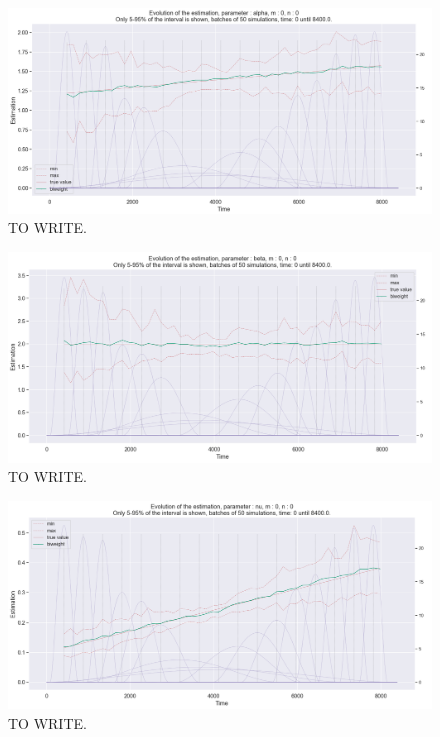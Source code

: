 \begin{figure}
\centering
\includegraphics[width = 0.90 \textwidth]{../imag/chap3/1/Figure_10.png}
\caption{TO WRITE.}
\label{fig:second_estimate_1_alpha}
\end{figure}

\begin{figure}
\centering
\includegraphics[width = 0.90 \textwidth]{../imag/chap3/1/Figure_11.png}
\caption{TO WRITE.}
\label{fig:second_estimate_1_beta}
\end{figure}

\begin{figure}
\centering
\includegraphics[width = 0.90 \textwidth]{../imag/chap3/1/Figure_12.png}
\caption{TO WRITE.}
\label{fig:second_estimate_1_nu}
\end{figure}
















